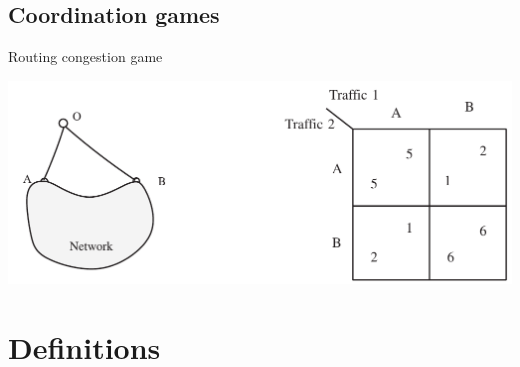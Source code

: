 \documentclass{beamer}
\begin{document}

\subsection{Coordination games}


\begin{frame}{Routing congestion game}
  \begin{center}
    \includegraphics[width=\textwidth,height=0.8\textheight,keepaspectratio]{img/routing-congestion-game.png}
  \end{center}
\end{frame}

\section{Definitions}
\end{document}
